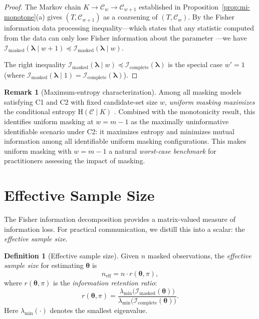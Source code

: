 \documentclass[11pt]{article}
\theoremstyle{definition}
\newtheorem{definition}{Definition}
\newtheorem{remark}{Remark}
\theoremstyle{plain}
\renewcommand{\v}[1]{\boldsymbol{#1}}
\newcommand{\btheta}{\v{\theta}}
\newcommand{\Loewner}{\preceq}
\newcommand{\FI}{\mathcal{I}}       %
\newcommand{\Ent}{\mathrm{H}}       %
\begin{document}
\begin{proof}
The Markov chain $K \to \mathcal{C}_w \to \mathcal{C}_{w+1}$
established in Proposition~\ref{prop:mi-monotone}(a) gives
$(T, \mathcal{C}_{w+1})$ as a coarsening of $(T, \mathcal{C}_w)$.
By the Fisher information data processing inequality---which states
that any statistic computed from the data can only lose Fisher
information about the parameter \citep{zamir1998}---we have
$\FI_{\mathrm{masked}}(\v{\lambda} \mid w+1)
\Loewner
\FI_{\mathrm{masked}}(\v{\lambda} \mid w)$.

The right inequality
$\FI_{\mathrm{masked}}(\v{\lambda} \mid w)
\Loewner \FI_{\mathrm{complete}}(\v{\lambda})$
is the special case $w' = 1$ (where
$\FI_{\mathrm{masked}}(\v{\lambda} \mid 1) = \FI_{\mathrm{complete}}(\v{\lambda})$).
\end{proof}

\begin{remark}[Maximum-entropy characterization]
\label{rem:max-entropy}
Among all masking models satisfying C1 and C2 with fixed candidate-set
size $w$, \emph{uniform masking maximizes} the conditional entropy
$\Ent(\mathcal{C} \mid K)$
\citep{towell2026exponential}.
Combined with the monotonicity result, this identifies uniform masking
at $w = m - 1$ as the maximally uninformative identifiable scenario
under C2: it maximizes entropy and minimizes mutual information among
all identifiable uniform masking configurations.
This makes uniform masking with $w = m - 1$ a natural \emph{worst-case
benchmark} for practitioners assessing the impact of masking.
\end{remark}


\section{Effective Sample Size}
\label{sec:ess}

The Fisher information decomposition provides a matrix-valued measure
of information loss.
For practical communication, we distill this into a scalar:
the \emph{effective sample size}.

\begin{definition}[Effective sample size]
\label{def:ess}
Given $n$ masked observations, the \emph{effective sample size}
for estimating $\btheta$ is
\begin{equation}
\label{eq:ess-def}
    n_{\mathrm{eff}}
    = n \cdot r(\btheta, \pi),
\end{equation}
where $r(\btheta, \pi)$ is the \emph{information retention ratio}:
\begin{equation}
\label{eq:irr}
    r(\btheta, \pi)
    = \frac{\lambda_{\min}\bigl(\FI_{\mathrm{masked}}(\btheta)\bigr)}
           {\lambda_{\min}\bigl(\FI_{\mathrm{complete}}(\btheta)\bigr)}.
\end{equation}
Here $\lambda_{\min}(\cdot)$ denotes the smallest eigenvalue.
\end{definition}
\end{document}
